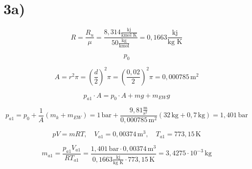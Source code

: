 

\section*{3a)}

\[
R = \frac{R_u}{\mu} = \frac{8,314 \frac{\text{kj}}{\text{kmol K}}}{50 \frac{\text{kg}}{\text{kmol}}} = 0,1663 \frac{\text{kj}}{\text{kg K}}
\]

\[
p_0
\]

\[
A = r^2 \pi = \left(\frac{d}{2}\right)^2 \pi = \left(\frac{0,02}{2}\right)^2 \pi = 0,000785 \, \text{m}^2
\]

\[
p_{a1} \cdot A = p_0 \cdot A + mg + m_{EW} g
\]

\[
p_{a1} = p_0 + \frac{1}{A} (m_k + m_{EW}) = 1 \, \text{bar} + \frac{9,81 \frac{\text{m}}{\text{s}^2}}{0,000785 \, \text{m}^2} (32 \, \text{kg} + 0,7 \, \text{kg}) = 1,401 \, \text{bar}
\]

\[
pV = mRT, \quad V_{a1} = 0,00374 \, \text{m}^3, \quad T_{a1} = 773,15 \, \text{K}
\]

\[
m_{a1} = \frac{p_{a1} V_{a1}}{RT_{a1}} = \frac{1,401 \, \text{bar} \cdot 0,00374 \, \text{m}^3}{0,1663 \frac{\text{kj}}{\text{kg K}} \cdot 773,15 \, \text{K}} = 3,4275 \cdot 10^{-3} \, \text{kg}
\]